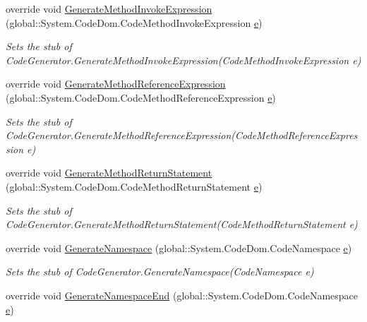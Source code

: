 \begin{DoxyCompactItemize}
override void \hyperlink{class_system_1_1_code_dom_1_1_compiler_1_1_fakes_1_1_stub_code_compiler_aa4bd2e271a80194f55d1848d2b461212}{Generate\-Method\-Invoke\-Expression} (global\-::\-System.\-Code\-Dom.\-Code\-Method\-Invoke\-Expression \hyperlink{jquery-1_810_82_8min_8js_a2c038346d47955cbe2cb91e338edd7e1}{e})
\begin{DoxyCompactList}\small\item\em Sets the stub of Code\-Generator.\-Generate\-Method\-Invoke\-Expression(\-Code\-Method\-Invoke\-Expression e)\end{DoxyCompactList}\item 
override void \hyperlink{class_system_1_1_code_dom_1_1_compiler_1_1_fakes_1_1_stub_code_compiler_aa7f3ba4943dd7d9d09ddeb73ba4f5c54}{Generate\-Method\-Reference\-Expression} (global\-::\-System.\-Code\-Dom.\-Code\-Method\-Reference\-Expression \hyperlink{jquery-1_810_82_8min_8js_a2c038346d47955cbe2cb91e338edd7e1}{e})
\begin{DoxyCompactList}\small\item\em Sets the stub of Code\-Generator.\-Generate\-Method\-Reference\-Expression(\-Code\-Method\-Reference\-Expression e)\end{DoxyCompactList}\item 
override void \hyperlink{class_system_1_1_code_dom_1_1_compiler_1_1_fakes_1_1_stub_code_compiler_ab625e48c69c6bf4e9417dd971c52236b}{Generate\-Method\-Return\-Statement} (global\-::\-System.\-Code\-Dom.\-Code\-Method\-Return\-Statement \hyperlink{jquery-1_810_82_8min_8js_a2c038346d47955cbe2cb91e338edd7e1}{e})
\begin{DoxyCompactList}\small\item\em Sets the stub of Code\-Generator.\-Generate\-Method\-Return\-Statement(\-Code\-Method\-Return\-Statement e)\end{DoxyCompactList}\item 
override void \hyperlink{class_system_1_1_code_dom_1_1_compiler_1_1_fakes_1_1_stub_code_compiler_a3b5492fd8337506444f8bebeb9f43060}{Generate\-Namespace} (global\-::\-System.\-Code\-Dom.\-Code\-Namespace \hyperlink{jquery-1_810_82_8min_8js_a2c038346d47955cbe2cb91e338edd7e1}{e})
\begin{DoxyCompactList}\small\item\em Sets the stub of Code\-Generator.\-Generate\-Namespace(\-Code\-Namespace e)\end{DoxyCompactList}\item 
override void \hyperlink{class_system_1_1_code_dom_1_1_compiler_1_1_fakes_1_1_stub_code_compiler_a328d834b81c046fb151566f722dbfae1}{Generate\-Namespace\-End} (global\-::\-System.\-Code\-Dom.\-Code\-Namespace \hyperlink{jquery-1_810_82_8min_8js_a2c038346d47955cbe2cb91e338edd7e1}{e})

\end{DoxyCompactItemize}
